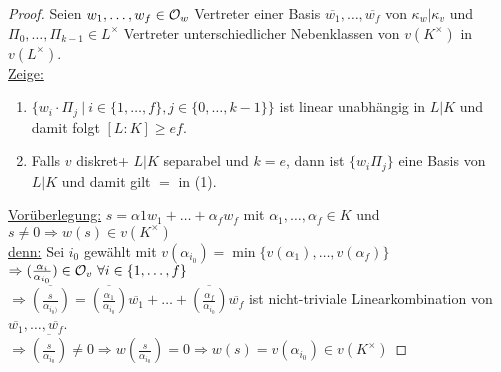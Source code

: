 \begin{proof}
Seien $w_1, \dots, w_f \in \mathcal{O}_w$ Vertreter einer Basis $\overline{w_1}, \dots, \overline{w_f}$ von $\kappa_w | \kappa_v$ und $\Pi_0, \dots, \Pi_{k-1} \in L^\times $ Vertreter unterschiedlicher Nebenklassen von $v(K^\times)$ in $v(L^\times)$.\\
\underline{Zeige:} \begin{enumerate}[(1)]
\item $\{w_i \cdot \Pi_j \ | \ i \in \{1, \dots, f\}, j \in \{0 , \dots, k-1\}\}$ ist linear unabhängig in $L|K$ und damit folgt $[L:K] \geq ef$.
\item Falls $v$ diskret+ $L|K$ separabel und $k=e$, dann ist $\{w_i\Pi_j\}$ eine Basis von $L|K$ und damit gilt \glqq $=$ \grqq in (1).
\end{enumerate}
\underline{Vorüberlegung:} $s=\alpha1w_1 + \dots + \alpha_f w_f$ mit $\alpha_1, \dots, \alpha_f \in K$ und $s \neq 0 \Rightarrow w(s) \in v(K^\times)$\\
\underline{denn:} Sei $i_0$ gewählt mit $v(\alpha_{i_0})=\min\{v(\alpha_1), \dots, v(\alpha_f)\}$\\
$\Rightarrow (\frac{\alpha_i}{\alpha_{i_0}}) \in \mathcal{O}_v \ \forall i \in \{1, \dots, f\}$\\
$\Rightarrow \overline{(\frac{s}{\alpha_{i_0)}})}=\overline{(\frac{\alpha_1}{\alpha_{i_0}})}\overline{w_1}+\dots+\overline{(\frac{\alpha_f}{\alpha_{i_0}})} \overline{w_f}$ ist nicht-triviale Linearkombination von $\overline{w_1}, \dots, \overline{w_f}$.\\
$\Rightarrow \overline{(\frac{s}{\alpha_{i_0}})}\neq 0 \Rightarrow w(\frac{s}{\alpha_{i_0}})=0 \Rightarrow w(s)=v(\alpha_{i_0}) \in v(K^\times)$

\end{proof}